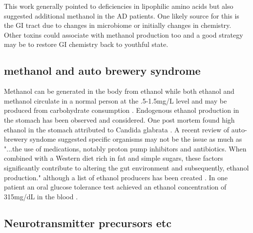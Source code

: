 

This work generally pointed to deficiencies in lipophilic amino
acids but also suggested additional methanol in the AD patients.
One likely source for this is the GI tract due to changes in microbiome
or initially changes in chemistry. Other toxins could associate
with methanol production too and a good strategy may be to
restore GI chemistry back to youthful state.  

\subsection{methanol and auto brewery syndrome } 

Methanol can be generated in the body from ethanol 
\cite{DinisOliveira_Ux201c_char_2024} while both  ethanol
and methanol circulate in a normal person at the .5-1.5mg/L
level and may be produced from carbohydrate consumption
\cite{10.1093/jat/bkab112}. 
Endogenous ethanol production in the stomach has been observed
\cite{Stamation_Endogenous_Ethanol_Production_2025}
and considered. One post mortem found high ethanol in the stomach
attributed to Candida glabrata \cite{10.1093/jat/bkaf039}.
A recent review of auto-brewery syndome suggested specific organisms
may not be the issue as much as "...the use of medications, notably proton pump inhibitors and antibiotics. When combined with a Western diet rich in fat and simple sugars, these factors significantly contribute to altering the gut environment and subsequently, ethanol production."
\cite{Meijnikman_Nieuwdorp_Schnabl_Endogenous_ethanol_production_2024}
although a list of ethanol producers has been created
\cite{Mbaye_Wasfy_Alou_catalog_ethanol_2024}.
In one patient an oral glucose tolerance test achieved an ethanol
concentration of 315mg/dL in the blood
\cite{SER2023102514}.



\subsection{Neurotransmitter precursors etc }

